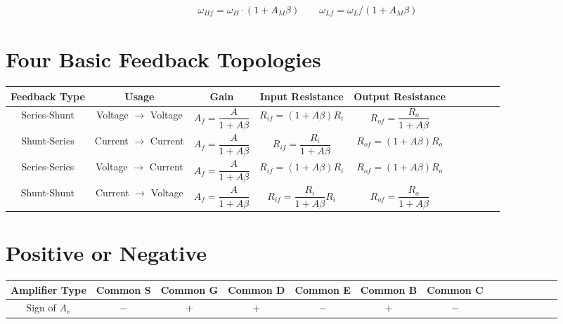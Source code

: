 \begin{equation*}
  \begin{aligned}
    \omega_{Hf} = \omega_H \cdot \left( 1 + A_M \beta \right) \quad\quad \omega_{Lf} = \omega_L / \left( 1 + A_M \beta \right)
  \end{aligned}
\end{equation*}

\section{Four Basic Feedback Topologies}

\begin{table}[h]
  \centering
  \begin{tabular}{|Sc|Sc|Sc|Sc|Sc|}
    \hline
    Feedback Type & Usage & Gain & Input Resistance & Output Resistance \\
    \hline
    Series-Shunt & Voltage $\rightarrow$ Voltage & $A_f = \dfrac{A}{1 + A \beta} $ & $ R_{if} = \left( 1 + A \beta \right) R_i$ & $R_{of} = \dfrac{R_o}{1 + A \beta} $ \\
    \hline
    Shunt-Series & Current $\rightarrow$ Current & $A_f = \dfrac{A}{1 + A \beta} $ & $ R_{if} = \dfrac{R_i}{1 + A \beta} $ & $R_{of} = \left( 1 + A \beta \right) R_o $ \\
    \hline
    Series-Series & Voltage $\rightarrow$ Current & $A_f = \dfrac{A}{1 + A \beta} $ & $ R_{if} = \left( 1 + A \beta \right) R_i$ & $R_{of} = \left( 1 + A \beta \right) R_o $ \\
    \hline
    Shunt-Shunt & Current $\rightarrow$ Voltage & $A_f = \dfrac{A}{1 + A \beta} $ & $ R_{if} = \dfrac{R_i}{1 + A \beta}  R_i$ & $R_{of} = \dfrac{R_o}{1 + A \beta} $ \\
    \hline
  \end{tabular}
\end{table}

\section{Positive or Negative}

\begin{table}[h]
  \centering
  \begin{tabular}{|Sc|Sc|Sc|Sc|Sc|Sc|Sc|}
    \hline
    Amplifier Type & Common S & Common G & Common D & Common E & Common B & Common C \\
    \hline
    Sign of $A_v$ & $-$ & $+$ & $+$ & $-$ & $+$ & $-$ \\
    \hline
  \end{tabular}
\end{table}

